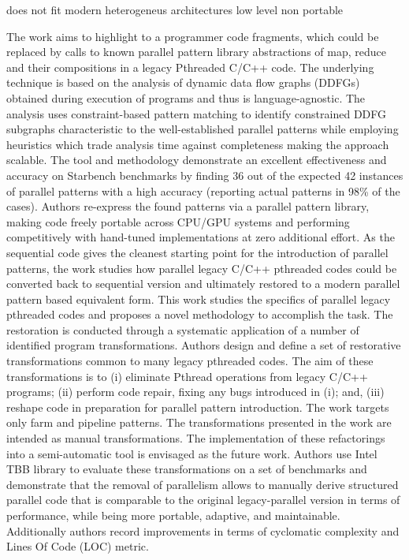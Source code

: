 does not fit modern heterogeneus architectures
low level non portable 


The work \cite{roberto-lozano-skeletons} aims to highlight to a programmer code fragments, which could be replaced by calls to known parallel pattern library abstractions of map, reduce and their compositions in a legacy Pthreaded C/C++ code. The underlying technique is based on the analysis of dynamic data flow graphs (DDFGs) obtained during execution of programs and thus is language-agnostic. The analysis uses constraint-based pattern matching to identify constrained DDFG subgraphs characteristic to the well-established parallel patterns while employing heuristics which trade analysis time against completeness making the approach scalable. The tool and methodology demonstrate an excellent effectiveness and accuracy on Starbench benchmarks by finding 36 out of the expected 42 instances of parallel patterns with a high accuracy (reporting actual patterns in 98\% of the cases). Authors re-express the found patterns via a parallel pattern library, making code freely portable across CPU/GPU systems and performing competitively with hand-tuned implementations at zero additional effort.\newline\null
\quad As the sequential code gives the cleanest starting point for the introduction of parallel patterns, the work \cite{} studies how parallel legacy C/C++ pthreaded codes could be converted back to sequential version and ultimately restored to a modern parallel pattern based equivalent form. This work studies the specifics of parallel legacy pthreaded codes and proposes a novel methodology to accomplish the task. The restoration is conducted through a systematic application of a number of identified program transformations. Authors design and define a set of restorative transformations common to many legacy pthreaded codes. The aim of these transformations is to (i) eliminate Pthread operations from legacy C/C++ programs; (ii) perform code repair, fixing any bugs introduced in (i); and, (iii) reshape code in preparation for parallel pattern introduction. 
The work targets only farm and pipeline patterns. The transformations presented in the work are intended as manual transformations. The implementation of these refactorings into a semi-automatic tool is envisaged as the future work. Authors use Intel TBB library to evaluate these transformations on a set of benchmarks and demonstrate that the removal of parallelism allows to manually derive structured parallel code that is comparable to the original legacy-parallel version in terms of performance, while being more portable, adaptive, and maintainable. Additionally authors record improvements in terms of cyclomatic complexity \cite{} and Lines Of Code (LOC) metric.


